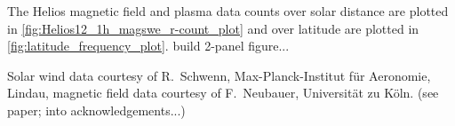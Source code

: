 The Helios magnetic field and plasma data counts over solar distance are plotted in \autoref{fig:Helios12_1h_magswe_r-count_plot} and over latitude are plotted in \autoref{fig:latitude_frequency_plot}. build 2-panel figure...\\
\begin{figure}[htb]
	\begin{floatrow}
	\end{floatrow}
\end{figure}

Solar wind data courtesy of R.~Schwenn, Max-Planck-Institut für Aeronomie, Lindau, magnetic field data courtesy of F.~Neubauer, Universität zu Köln. (see paper; into acknowledgements...)\\

